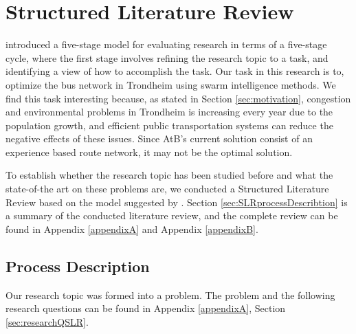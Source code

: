 \section{Structured Literature Review}
\label{sec:structuredLiteratureReview}

\citet{cohen88} introduced a five-stage model for evaluating research in terms of a five-stage cycle, where the first stage involves refining the research topic to a task, and identifying a view of how to accomplish the task. 
Our task in this research is to, optimize the bus network in Trondheim using swarm intelligence methods. %
We find this task interesting because, as stated in Section \vref{sec:motivation}, congestion and environmental problems in Trondheim is increasing every year due to the population growth\citep{website:miljopakken}, and efficient public transportation systems can reduce the negative effects of these issues. Since AtB's\citep{website:atb} current solution consist of an experience based route network, it may not be the optimal solution. 

To establish whether the research topic has been studied before\citep{cohen88} and what the state-of-the art on these problems are, we conducted a Structured Literature Review based on the model suggested by \citet{kofod2014}.%
Section \vref{sec:SLRprocessDescribtion} is a summary of the conducted literature review, and the complete review can be found in Appendix \vref{appendixA} and Appendix \vref{appendixB}. 

\subsection{Process Description}
\label{sec:SLRprocessDescribtion}

Our research topic was formed into a problem. The problem and the following research questions can be found in Appendix \ref{appendixA}, Section \vref{sec:researchQSLR}.

